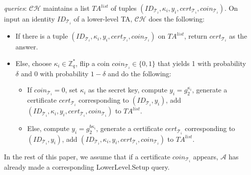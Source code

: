 \documentclass[10pt,journal,compsoc]{IEEEtran}
\begin{document}
\smallskip
{} \emph{queries}: $\mathcal {CH}$
maintains a list $TA^{list}$ of tuples
$(ID_{\mathcal{T}_i},\kappa_i,y_i,cert_{\mathcal{T}_i},coin_{\mathcal{T}_i}).$
On input an identity $ID_{\mathcal{T}_i}$ of a lower-level TA,
$\mathcal {CH}$ does the following:
\begin{itemize}
  \item If there is a tuple $(ID_{\mathcal{T}_i},\kappa_i,y_i,cert_{\mathcal{T}_i},coin_{\mathcal{T}_i})$
  on $TA^{list}$, return $cert_{\mathcal{T}_i}$ as the answer.
  \item Else, choose
$\kappa_i\in \mathbb{Z}_q^*$, flip a coin $coin_{\mathcal{T}_i}\in
\{0,1\}$ that yields 1 with probability $\delta$ and 0 with
probability $1-\delta$ and do the following:
\begin{itemize}
  \item If
$coin_{\mathcal{T}_i}=0$, set $\kappa_i$ as the secret key, compute
$y_i=g_2^{\kappa_i}$, generate a certificate $cert_{\mathcal{T}_i}$
corresponding to $(ID_{\mathcal{T}_i},y_i)$, add
$(ID_{\mathcal{T}_i},\kappa_i,y_i,cert_{\mathcal{T}_i},coin_{\mathcal{T}_i})$
to $TA^{list}$.
  \item Else, compute $y_i=g_2^{b\kappa_i}$, generate a certificate $cert_{\mathcal{T}_i}$
corresponding to $(ID_{\mathcal{T}_i},y_i)$, add
$(ID_{\mathcal{T}_i},\kappa_i,y_i,cert_{\mathcal{T}_i},coin_{\mathcal{T}_i})$
to $TA^{list}$.
\end{itemize}
\end{itemize}

In the rest of this paper, we assume that if a certificate
$coin_{\mathcal{T}_i}$ appears, $\mathcal {A}$ has already made a
corresponding {\sf LowerLevel.Setup} query.
\end{document}
